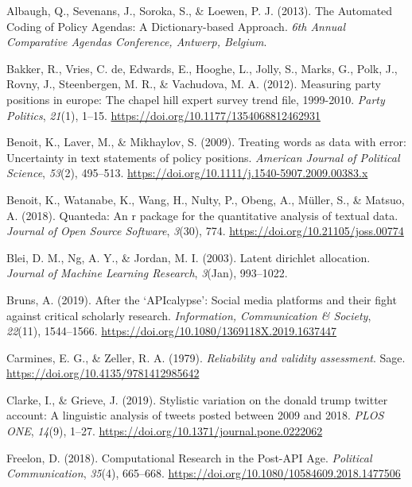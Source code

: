 \documentclass[
]{book}
\newlength{\cslhangindent}
\newenvironment{CSLReferences}[2] %
 {\begin{list}{}{%
  \setlength{\itemindent}{0pt}
  \setlength{\leftmargin}{0pt}
  \setlength{\parsep}{0pt}
  \ifodd #1
   \setlength{\leftmargin}{\cslhangindent}
   \setlength{\itemindent}{-1\cslhangindent}
  \fi
  \setlength{\itemsep}{#2\baselineskip}}}
 {\end{list}}
\begin{document}
\label{refs}
\begin{CSLReferences}{1}{2}
Albaugh, Q., Sevenans, J., Soroka, S., \& Loewen, P. J. (2013). {The Automated Coding of Policy Agendas: A Dictionary-based Approach}. \emph{6th Annual Comparative Agendas Conference, Antwerp, Belgium}.

Bakker, R., Vries, C. de, Edwards, E., Hooghe, L., Jolly, S., Marks, G., Polk, J., Rovny, J., Steenbergen, M. R., \& Vachudova, M. A. (2012). Measuring party positions in europe: The chapel hill expert survey trend file, 1999-2010. \emph{Party Politics}, \emph{21}(1), 1--15. \url{https://doi.org/10.1177/1354068812462931}

Benoit, K., Laver, M., \& Mikhaylov, S. (2009). Treating words as data with error: Uncertainty in text statements of policy positions. \emph{American Journal of Political Science}, \emph{53}(2), 495--513. \url{https://doi.org/10.1111/j.1540-5907.2009.00383.x}

Benoit, K., Watanabe, K., Wang, H., Nulty, P., Obeng, A., Müller, S., \& Matsuo, A. (2018). Quanteda: An r package for the quantitative analysis of textual data. \emph{Journal of Open Source Software}, \emph{3}(30), 774. \url{https://doi.org/10.21105/joss.00774}

Blei, D. M., Ng, A. Y., \& Jordan, M. I. (2003). Latent dirichlet allocation. \emph{Journal of Machine Learning Research}, \emph{3}(Jan), 993--1022.

Bruns, A. (2019). After the `{API}calypse': Social media platforms and their fight against critical scholarly research. \emph{Information, Communication \& Society}, \emph{22}(11), 1544--1566. \url{https://doi.org/10.1080/1369118X.2019.1637447}

Carmines, E. G., \& Zeller, R. A. (1979). \emph{Reliability and validity assessment}. Sage. \url{https://doi.org/10.4135/9781412985642}

Clarke, I., \& Grieve, J. (2019). Stylistic variation on the donald trump twitter account: A linguistic analysis of tweets posted between 2009 and 2018. \emph{PLOS ONE}, \emph{14}(9), 1--27. \url{https://doi.org/10.1371/journal.pone.0222062}

Freelon, D. (2018). {Computational Research in the Post-API Age}. \emph{Political Communication}, \emph{35}(4), 665--668. \url{https://doi.org/10.1080/10584609.2018.1477506}


\end{CSLReferences}
\end{document}
